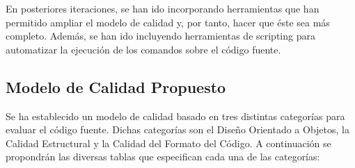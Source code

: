 \documentclass[11pt]{article}
\begin{document}
En posteriores iteraciones, se han ido incorporando herramientas que han permitido ampliar el modelo de calidad y, por tanto, hacer que éste sea más completo. Además, se han ido incluyendo herramientas de scripting para automatizar la ejecución de los comandos sobre el código fuente.

\subsection{Modelo de Calidad Propuesto}

Se ha establecido un modelo de calidad basado en tres distintas categorías para evaluar el código fuente. Dichas categorías son el Diseño Orientado a Objetos, la Calidad Estructural y la Calidad del Formato del Código. A continuación se propondrán las diversas tablas que especifican cada una de las categorías:
\end{document}
